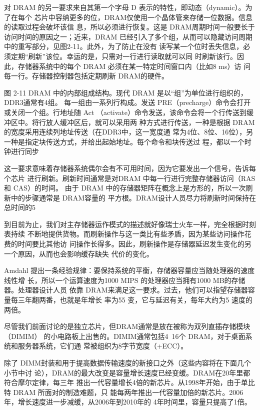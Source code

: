 对 DRAM 的另一要求来自其第一个字母 D 表示的特性，即动态（dynamic）。为了在每个
芯片中容纳更多的位，DRAM仅使用一个晶体管来存储一位数据。信息的读取过程会破坏该信
息，所以必须进行恢复。这是 DRAM周期时间一般要长于访问时间的原因之一；近来，DRAM
已经引入了多个组，从而可以隐藏访问周期中的重写部分，见图2-11。此外，为了防止在没有
读写某一个位时丢失信息，必须定期“刷新”该位。幸运的是，只需对一行进行读取就可以同
时刷新该行。因此，存储器系统中的每个 DRAM 必须在某一特定时间窗口内（比如8 ms）访
问每一行。存储器控制器包括定期刷新 DRAM的硬件。


图 2-11
DRAM 中的内部组成结构。现代 DRAM 是以“组”为单位进行组织的，DDR3通常有4组。
每一组由一系列行构成。发送 PRE（precharge）命令会打开或关闭一个组。行地址随 Act
（activate）命令发送，该命令会将一个行传送到缓冲区中。将行放人缓冲区后，就可以采用两
种方式进行传送，一种是根据 DRAM 的宽度采用连续列地址传送（在DDR3中，这一宽度通
常为4位、8位、16位），另一种是指定块传送方式，并给出起始地址。每个命令和块传送过
程，都以一个时钟进行同步

这一要求意味着存储器系统偶尔会有不可用时间，因为它要发出一个信号，告诉每个芯片
进行刷新。刷新时间通常是对DRAM 中每一行进行完整存储器访问（RAS 和 CAS）的时间。
由于 DRAM 中的存储器矩阵在概念上是方形的，所以一次刷新中的步骤通常是 DRAM容量的
平方根。DRAM设计人员尽力将刷新时间保持在总时间的5%

到目前为止，我们对主存储器运作模式的描述就好像瑞士火车一样，完全根据时刻表持续
不断地提供货物。而刷新操作与这一类比有些矛盾，因为某些访问操作花费的时间要比其他访
问操作长得多。因此，刷新操作是存储器延迟发生变化的另一个原因，从而也会影响缓存缺失
代价的变化。

Amdahl 提出一条经验规律：要保持系统的平衡，存储器容量应当随处理器的速度线性增
长，所以一个运算速度为1000 MIPS 的处理器应当拥有1000 MB的存储器。处理器设计人员
依靠 DRAM来满足这一要求。过去，他们可以指望存储器容量每三年翻两番，也就是年增长
率为55%
变，它与延迟有关，每年大约为5%
速度的两倍。

尽管我们前面讨论的是独立芯片，但DRAM通常是放在被称为双列直插存储模块（DIMIM）
的小电路板上出售的。DIMIM通常包括4~16个 DRAM，对于桌面系统和服务器系统，它们通
常被组织为8字节宽度（+ECC）。

除了 DIMM封装和用于提高数据传输速度的新接口之外（这些内容将在下面几个小节中讨
论），DRAM的最大改变是容量增长速度已经变缓。DRAM在20年里都符合摩尔定律，每三年
推出一代容量增长4倍的新芯片。从1998年开始，由于单比特 DRAM 所面对的制造难题，只
能每两年推出一代容量加倍的新芯片。2006年，增长速度进一步减缓，从2006年到2010年的
4年时间里，容量只提高了1倍。


